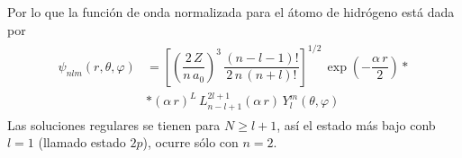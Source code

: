 Por lo que la función de onda normalizada para el átomo de hidrógeno está dada por
\begin{align}
\begin{aligned}
\psi_{n l m} (r , \theta, \varphi) &= \left[ \left( \dfrac{2 \, Z}{n \, a_{0}} \right)^{3} \, \dfrac{(n - l -1)!}{2 \, n \, (n + l)!} \right]^{1/2} \, \exp \left( - \dfrac{\alpha \, r}{2} \right) * \\[1em]
&* (\alpha \, r)^{L} \, L_{n - l +1}^{2 l +1}(\alpha \, r) \, Y_{l}^{m} (\theta, \varphi)
\end{aligned}
\label{eq:ecuacion_13_091}  
\end{align}
Las soluciones regulares se tienen para $N \geq l + 1$, así el estado más bajo conb $l = 1$ (llamado estado $2p$), ocurre sólo con $n = 2$.


